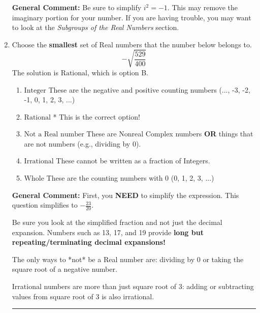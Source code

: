 \documentclass{extbook}[14pt]
\newcommand{\litem}[1]{\item #1

\rule{\textwidth}{0.4pt}}
\begin{document}
\begin{enumerate}
{\textbf{General Comment:} Be sure to simplify $i^2 = -1$. This may remove the imaginary portion for your number. If you are having trouble, you may want to look at the \textit{Subgroups of the Real Numbers} section.
}
\litem{
Choose the \textbf{smallest} set of Real numbers that the number below belongs to.
\[ -\sqrt{\frac{529}{400}} \]
The solution is \( \text{Rational} \), which is option B.\begin{enumerate}[label=\Alph*.]
\item \( \text{Integer} \)
These are the negative and positive counting numbers (..., -3, -2, -1, 0, 1, 2, 3, ...)
\item \( \text{Rational} \)
* This is the correct option!
\item \( \text{Not a Real number} \)
These are Nonreal Complex numbers \textbf{OR} things that are not numbers (e.g., dividing by 0).
\item \( \text{Irrational} \)
These cannot be written as a fraction of Integers.
\item \( \text{Whole} \)
These are the counting numbers with 0 (0, 1, 2, 3, ...)
\end{enumerate}

\textbf{General Comment:} First, you \textbf{NEED} to simplify the expression. This question simplifies to $-\frac{23}{20}$. 
 
 Be sure you look at the simplified fraction and not just the decimal expansion. Numbers such as 13, 17, and 19 provide \textbf{long but repeating/terminating decimal expansions!} 
 
 The only ways to *not* be a Real number are: dividing by 0 or taking the square root of a negative number. 
 
 Irrational numbers are more than just square root of 3: adding or subtracting values from square root of 3 is also irrational.
}
\end{enumerate}
\end{document}
